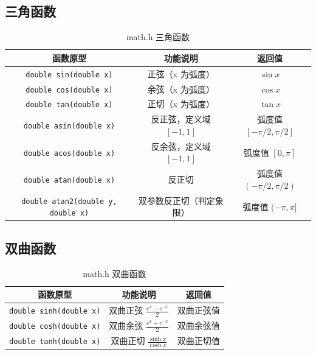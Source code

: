 \subsection{三角函数}

\begin{table}[H]
\centering
\small
\renewcommand{\arraystretch}{1.6}
\begin{tabulary}{\linewidth}{CCC}
\toprule
\textbf{函数原型} & \textbf{功能说明} & \textbf{返回值} \\ \midrule
\texttt{double sin(double x)} & 正弦（x 为弧度） & $\sin x$ \\ 
\texttt{double cos(double x)} & 余弦（x 为弧度） & $\cos x$ \\ 
\texttt{double tan(double x)} & 正切（x 为弧度） & $\tan x$ \\ 
\texttt{double asin(double x)} & 反正弦，定义域 $[-1, 1]$ & 弧度值 $[-\pi/2, \pi/2]$ \\ 
\texttt{double acos(double x)} & 反余弦，定义域 $[-1, 1]$ & 弧度值 $[0, \pi]$ \\ 
\texttt{double atan(double x)} & 反正切 & 弧度值 $(-\pi/2, \pi/2)$ \\ 
\texttt{double atan2(double y, double x)} & 双参数反正切（判定象限） & 弧度值 $(-\pi, \pi]$ \\ \bottomrule
\end{tabulary}
\caption{math.h 三角函数}
\label{tab:math_trig}
\end{table}

\subsection{双曲函数}

\begin{table}[H]
\centering
\small
\renewcommand{\arraystretch}{1.5}
\begin{tabulary}{\linewidth}{CCC}
\toprule
\textbf{函数原型} & \textbf{功能说明} & \textbf{返回值} \\ \midrule
\texttt{double sinh(double x)} & 双曲正弦 $\frac{e^x - e^{-x}}{2}$ & 双曲正弦值 \\ 
\texttt{double cosh(double x)} & 双曲余弦 $\frac{e^x + e^{-x}}{2}$ & 双曲余弦值 \\ 
\texttt{double tanh(double x)} & 双曲正切 $\frac{\sinh x}{\cosh x}$ & 双曲正切值 \\ \bottomrule
\end{tabulary}
\caption{math.h 双曲函数}
\label{tab:math_hyper}
\end{table}


